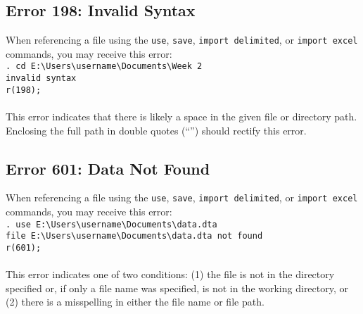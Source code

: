 \documentclass[letterpaper,11pt]{article}
\begin{document}
\subsection{Error 198: Invalid Syntax}
When referencing a file using the \texttt{{\color{Red}use}}, \texttt{{\color{Red}save}}, \texttt{{\color{Red}import delimited}}, or \texttt{{\color{Red}import excel}} commands, you may receive this error: \\
\texttt{. cd E:\textbackslash{}Users\textbackslash{}username\textbackslash{}Documents\textbackslash{}Week 2}\\
\texttt{{\color{Red}invalid syntax}}\\
\texttt{{\color{Blue}r(198);}}\\
\\
This error indicates that there is likely a space in the given file or directory path. Enclosing the full path in double quotes (``'') should rectify this error.\\
\subsection{Error 601: Data Not Found}
When referencing a file using the \texttt{{\color{Red}use}}, \texttt{{\color{Red}save}}, \texttt{{\color{Red}import delimited}}, or \texttt{{\color{Red}import excel}} commands, you may receive this error: \\
\texttt{. use E:\textbackslash{}Users\textbackslash{}username\textbackslash{}Documents\textbackslash{}data.dta} \\
\texttt{{\color{Red}file E:\textbackslash{}Users\textbackslash{}username\textbackslash{}Documents\textbackslash{}data.dta not found}} \\
\texttt{{\color{Blue}r(601);}} \\
\\
This error indicates one of two conditions: (1) the file is not in the directory specified or, if only a file name was specified, is not in the working directory, or (2) there is a misspelling in either the file name or file path. \\
\end{document}
